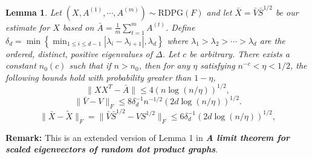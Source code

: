\documentclass[a4paper]{article}
\newtheorem{lemma}[fact]{Lemma}
\begin{document}
\begin{lemma}
\label{lm:AllDiff}
Let $(X, A^{(1)}, \cdots, A^{(m)}) \sim \mathrm{RDPG}(F)$ and let $\bar{X} = \bar{V} \bar{S}^{1/2}$ be our estimate for $X$ based on $\bar{A} = \frac{1}{m} \sum_{t = 1}^m A^{(t)}$.
Define $\delta_d = \min \left\{ \min_{1 \le i \le d-1} |\lambda_i - \lambda_{i+1}|, \lambda_d \right\}$ where $\lambda_1 > \lambda_2 > \cdots > \lambda_d$ are the ordered, distinct, positive eigenvalues of $\Delta$. Let $c$ be arbitrary. There exists a constant $n_0(c)$ such that if $n > n_0$, then for any $\eta$ satisfying $n^{-c} < \eta < 1/2$, the following bounds hold with probability greater than $1-\eta$,
\begin{equation}
\label{eqn:AbarDiff}
\|X X^T - \bar{A}\| \le 4(n \log(n/\eta))^{1/2},
\end{equation}
\begin{equation}
\label{eqn:VDiff}
\|\bar{V} - V\|_F \le 8 \delta_d^{-1} n^{-1/2} (2d \log(n/\eta))^{1/2}.
\end{equation}
\begin{equation}
\label{eqn:XDiff}
\|\bar{X} - \tilde{X}\|_F = \|\bar{V} \bar{S}^{1/2} - V S^{1/2}\|_F \le 6 \delta_d^{-1} (2d \log(n/\eta))^{1/2},
\end{equation}
\end{lemma}
\textbf{Remark:} This is an extended version of Lemma 1 in \textbf{\textit{A limit theorem for scaled eigenvectors of random dot product graphs}}. \\
\noindent
\end{document}
